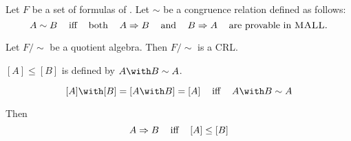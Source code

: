 \begin{theorem} [completeness]
Let $F$ be a set of formulas of {\MALLsystem}. 
Let $\sim$ be a congruence relation defined as follows:
\[  A \sim B  
\hskip 12pt \text{iff} 
\hskip 12pt \text{both} \hskip 12pt A \Rightarrow B 
\hskip 12pt \text{and}  \hskip 12pt B \Rightarrow A 
\hskip 12pt \text{are provable in {\sc MALL}.} \]

Let $ F / \sim $ be a quotient algebra. 
Then $ F / \sim $ is a CRL.

$ [A] \leq [B]$  is defined by  $A \with B \sim A$.

\[ [A] \with [B] = [ A \with B ] =  [A] 
\hskip 12pt \text{iff} \hskip 12pt A \with B \sim A\]

Then
\[
A \Rightarrow B  \hskip 12pt \text{iff}  \hskip 12pt  [A]  \leq [B] 
\]
\end{theorem}



